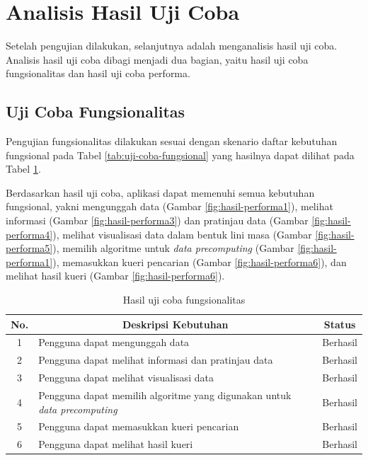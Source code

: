\section{Analisis Hasil Uji Coba}
\tab Setelah pengujian dilakukan, selanjutnya adalah menganalisis hasil uji coba. Analisis hasil uji coba dibagi menjadi dua bagian, yaitu hasil uji coba fungsionalitas dan hasil uji coba performa.

\subsection{Uji Coba Fungsionalitas}
\tab Pengujian fungsionalitas dilakukan sesuai dengan skenario daftar kebutuhan fungsional pada Tabel \ref{tab:uji-coba-fungsional} yang hasilnya dapat dilihat pada Tabel \ref{tab:hasil-uji-coba-fungsional}. 

Berdasarkan hasil uji coba, aplikasi dapat memenuhi semua kebutuhan fungsional, yakni mengunggah data (Gambar \ref{fig:hasil-performa1}), melihat informasi (Gambar \ref{fig:hasil-performa3}) dan pratinjau data (Gambar \ref{fig:hasil-performa4}), melihat visualisasi data dalam bentuk lini masa (Gambar \ref{fig:hasil-performa5}), memilih algoritme untuk \textit{data precomputing} (Gambar \ref{fig:hasil-performa1}), memasukkan kueri pencarian (Gambar \ref{fig:hasil-performa6}), dan melihat hasil kueri (Gambar \ref{fig:hasil-performa6}).

\begin{table}[H]
	\centering
	\begin{tabular}{ | c | p{5cm} | p{2cm} | }
		\hline
		\multicolumn{1}{|c}{\textbf{No.}} & \multicolumn{1}{|c}{\textbf{Deskripsi Kebutuhan}} & \multicolumn{1}{|c|}{\textbf{Status}}\\ \hline \hline
		1 & Pengguna dapat mengunggah data & Berhasil\\ \hline
		2 & Pengguna dapat melihat informasi dan pratinjau data & Berhasil\\ \hline
		3 & Pengguna dapat melihat visualisasi data & Berhasil \\ \hline
		4 & Pengguna dapat memilih algoritme yang digunakan untuk \textit{data precomputing} & Berhasil\\ \hline
		5 & Pengguna dapat memasukkan kueri pencarian & Berhasil \\ \hline
		6 & Pengguna dapat melihat hasil kueri & Berhasil\\ \hline
	\end{tabular} \caption{Hasil uji coba fungsionalitas}
	\label{tab:hasil-uji-coba-fungsional}
\end{table}

